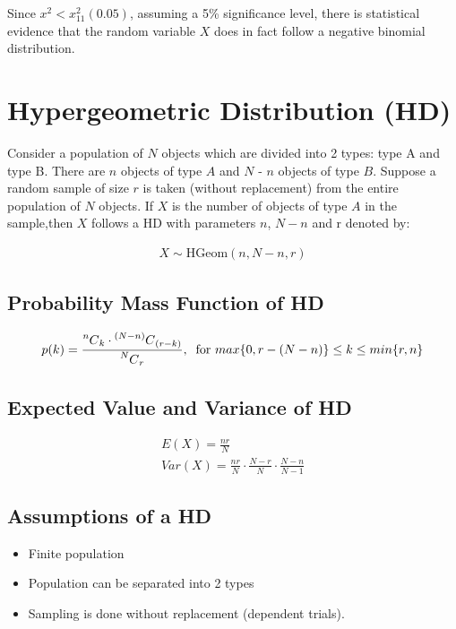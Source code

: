 \documentclass{article}
\newcommand\Mycomb[2][^n]{\prescript{#1\mkern-0.5mu}{}C_{#2}}
\begin{document}
Since $ x^2 < x^2_{11}(0.05) $, assuming a 5\% significance level,
there is statistical evidence that
the random variable $ X $ does in fact follow a negative binomial
distribution.

\section{Hypergeometric Distribution (HD)}
Consider a population of $N$ objects which are divided into 2 types: type A and type B.
There are
$n$ objects of type $A$ and $N$ - $n$ objects of type $B$.
Suppose a random sample of size $r$ is taken
(without replacement) from the entire population of $N$ objects. If $X$ 
is the number of objects of
type $A$ in the sample,then $X$ follows a HD with parameters $n$, 
$N-n$ and r denoted by:

\begin{gather*}
  X \sim \text{HGeom}(n, N-n, r)
\end{gather*}

\subsection{Probability Mass Function of HD}

\begin{gather*}
  p(k) =  \frac{\Mycomb[n]{k} \cdot \Mycomb[(N-n)]{(r-k)}}
  {\Mycomb[N]{r}}, \; \;
  \text{for } max\{ 0, r - (N - n) \} \leq k \leq min\{r, n\}
\end{gather*}

\subsection{Expected Value and Variance of HD}
\begin{gather*}
  E(X) = \frac{nr}{N} \\[5pt]
  Var(X) = \frac{nr}{N} \cdot \frac{N -r}{N} \cdot \frac{N-n}{N-1}
\end{gather*}

\subsection{Assumptions of a HD}
\begin{itemize}
  \item Finite population
  \item Population can be separated into 2 types
  \item Sampling is done without replacement (dependent trials).
\end{itemize}
\end{document}
